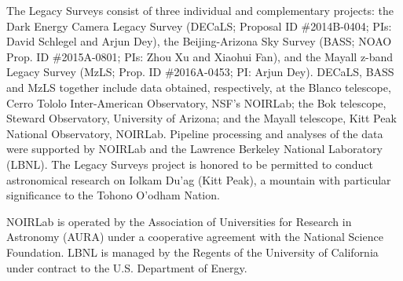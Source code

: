 \documentclass[twocolumn]{aastex631}
\begin{document}
The Legacy Surveys consist of three individual and complementary projects: the Dark Energy Camera Legacy Survey (DECaLS; Proposal ID \#2014B-0404; PIs: David Schlegel and Arjun Dey), the Beijing-Arizona Sky Survey (BASS; NOAO Prop. ID \#2015A-0801; PIs: Zhou Xu and Xiaohui Fan), and the Mayall z-band Legacy Survey (MzLS; Prop. ID \#2016A-0453; PI: Arjun Dey). DECaLS, BASS and MzLS together include data obtained, respectively, at the Blanco telescope, Cerro Tololo Inter-American Observatory, NSF’s NOIRLab; the Bok telescope, Steward Observatory, University of Arizona; and the Mayall telescope, Kitt Peak National Observatory, NOIRLab. Pipeline processing and analyses of the data were supported by NOIRLab and the Lawrence Berkeley National Laboratory (LBNL). The Legacy Surveys project is honored to be permitted to conduct astronomical research on Iolkam Du’ag (Kitt Peak), a mountain with particular significance to the Tohono O’odham Nation.

NOIRLab is operated by the Association of Universities for Research in Astronomy (AURA) under a cooperative agreement with the National Science Foundation. LBNL is managed by the Regents of the University of California under contract to the U.S. Department of Energy.
\end{document}
